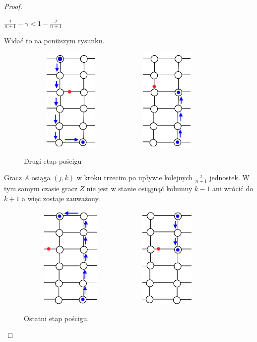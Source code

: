 \documentclass[brudnopis]{xmgr}
\theoremstyle{definition}
\begin{document}
\begin{proof}
	\begin{center}
	$\frac{j}{n+1} - \gamma < 1 - \frac{j}{n+1}$
	\end{center}
	Widać to na poniższym rysunku. 
	\begin{figure}[ht!]
	  \centering
	  \includegraphics[width=5cm,height=5cm]{rysunki/poscig_2.png}
	  \includegraphics[width=5cm,height=5cm]{rysunki/poscig_3.png}
	  \caption{Drugi etap pościgu}
	  \label{fig:drugi krok}
	\end{figure}

	\indent Gracz $A$ osiąga $(j,k)$ w kroku trzecim po upływie kolejnych $\frac{j}{n+1}$ jednostek. W tym samym czasie gracz $Z$ nie jest w stanie osiągnąć kolumny $k - 1$ ani wrócić do $k + 1$ a więc zostaje zauważony.
	\begin{figure}[ht!]
	  \centering
	  \includegraphics[width=5cm,height=5cm]{rysunki/poscig_4.png}
	  \includegraphics[width=5cm,height=5cm]{rysunki/poscig_5.png}
	  \caption{Ostatni etap pościgu.}
	  \label{fig:ostatni etap poscigu}
	\end{figure} 


\end{proof}
\end{document}
